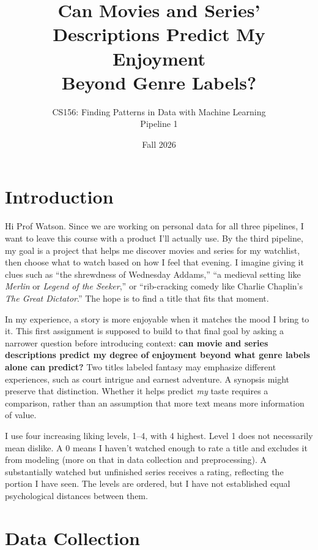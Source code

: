 \documentclass[11pt,letterpaper]{article}
\title{Can Movies and Series' Descriptions Predict My Enjoyment\\Beyond Genre Labels?}
\author{CS156: Finding Patterns in Data with Machine Learning\\Pipeline 1}
\date{Fall 2026}
\begin{document}
\maketitle
\vspace{-1.4em}
\section{Introduction}
Hi Prof Watson. Since we are working on personal data for all three pipelines, I want to leave this course with a product I'll actually use. By the third pipeline, my goal is a project that helps me discover movies and series for my watchlist, then choose what to watch based on how I feel that evening. I imagine giving it clues such as ``the shrewdness of Wednesday Addams,'' ``a medieval setting like \emph{Merlin} or \emph{Legend of the Seeker},'' or ``rib-cracking comedy like Charlie Chaplin's \emph{The Great Dictator}.'' The hope is to find a title that fits that moment.

In my experience, a story is more enjoyable when it matches the mood I bring to it. This first assignment is supposed to build to that final goal by asking a narrower question before introducing context: \textbf{can movie and series descriptions predict my degree of enjoyment beyond what genre labels alone can predict?} Two titles labeled fantasy may emphasize different experiences, such as court intrigue and earnest adventure. A synopsis might preserve that distinction. Whether it helps predict \emph{my} taste requires a comparison, rather than an assumption that more text means more information of value.

I use four increasing liking levels, 1--4, with 4 highest. Level 1 does not necessarily mean dislike. A 0 means I haven't watched enough to rate a title and excludes it from modeling (more on that in data collection and preprocessing). A substantially watched but unfinished series receives a rating, reflecting the portion I have seen. The levels are ordered, but I have not established equal psychological distances between them.

\section{Data Collection}
\end{document}
